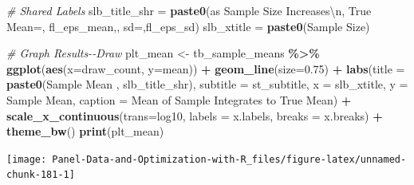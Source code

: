 \documentclass[
]{book}
\newenvironment{Shaded}{\begin{snugshade}}{\end{snugshade}}
\newcommand{\CharTok}[1]{\textcolor[rgb]{0.31,0.60,0.02}{#1}}
\newcommand{\CommentTok}[1]{\textcolor[rgb]{0.56,0.35,0.01}{\textit{#1}}}
\newcommand{\DataTypeTok}[1]{\textcolor[rgb]{0.13,0.29,0.53}{#1}}
\newcommand{\FloatTok}[1]{\textcolor[rgb]{0.00,0.00,0.81}{#1}}
\newcommand{\KeywordTok}[1]{\textcolor[rgb]{0.13,0.29,0.53}{\textbf{#1}}}
\newcommand{\NormalTok}[1]{#1}
\newcommand{\OperatorTok}[1]{\textcolor[rgb]{0.81,0.36,0.00}{\textbf{#1}}}
\newcommand{\StringTok}[1]{\textcolor[rgb]{0.31,0.60,0.02}{#1}}
\begin{document}
\begin{Shaded}
\begin{Highlighting}[]
\CommentTok{\# Shared Labels}
\NormalTok{slb\_title\_shr =}\StringTok{ }\KeywordTok{paste0}\NormalTok{(}\StringTok{\textquotesingle{}as Sample Size Increases}\CharTok{\textbackslash{}n}\StringTok{\textquotesingle{}}\NormalTok{,}
                       \StringTok{\textquotesingle{}True Mean=\textquotesingle{}}\NormalTok{, fl\_eps\_mean,}\StringTok{\textquotesingle{}, sd=\textquotesingle{}}\NormalTok{,fl\_eps\_sd)}
\NormalTok{slb\_xtitle =}\StringTok{ }\KeywordTok{paste0}\NormalTok{(}\StringTok{\textquotesingle{}Sample Size\textquotesingle{}}\NormalTok{)}

\CommentTok{\# Graph Results{-}{-}Draw}
\NormalTok{plt\_mean \textless{}{-}}\StringTok{ }\NormalTok{tb\_sample\_means }\OperatorTok{\%\textgreater{}\%}
\StringTok{  }\KeywordTok{ggplot}\NormalTok{(}\KeywordTok{aes}\NormalTok{(}\DataTypeTok{x=}\NormalTok{draw\_count, }\DataTypeTok{y=}\NormalTok{mean)) }\OperatorTok{+}
\StringTok{  }\KeywordTok{geom\_line}\NormalTok{(}\DataTypeTok{size=}\FloatTok{0.75}\NormalTok{) }\OperatorTok{+}
\StringTok{  }\KeywordTok{labs}\NormalTok{(}\DataTypeTok{title =} \KeywordTok{paste0}\NormalTok{(}\StringTok{\textquotesingle{}Sample Mean \textquotesingle{}}\NormalTok{, slb\_title\_shr),}
       \DataTypeTok{subtitle =}\NormalTok{ st\_subtitle,}
       \DataTypeTok{x =}\NormalTok{ slb\_xtitle,}
       \DataTypeTok{y =} \StringTok{\textquotesingle{}Sample Mean\textquotesingle{}}\NormalTok{,}
       \DataTypeTok{caption =} \StringTok{\textquotesingle{}Mean of Sample Integrates to True Mean\textquotesingle{}}\NormalTok{) }\OperatorTok{+}
\StringTok{  }\KeywordTok{scale\_x\_continuous}\NormalTok{(}\DataTypeTok{trans=}\StringTok{\textquotesingle{}log10\textquotesingle{}}\NormalTok{, }\DataTypeTok{labels =}\NormalTok{ x.labels, }\DataTypeTok{breaks =}\NormalTok{ x.breaks) }\OperatorTok{+}
\StringTok{  }\KeywordTok{theme\_bw}\NormalTok{()}
\KeywordTok{print}\NormalTok{(plt\_mean)}
\end{Highlighting}
\end{Shaded}

\begin{center}\texttt{[image: Panel-Data-and-Optimization-with-R\_files/figure-latex/unnamed-chunk-181-1]} \end{center}
\end{document}

